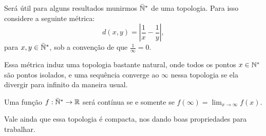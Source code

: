 Será útil para alguns resultados munirmos ${\mathbb{\bar{N}^*}}$ de uma
topologia. Para isso considere a seguinte métrica:
\begin{equation}
  \label{eq:metrica}
  d(x, y) = \left\lvert \frac{1}{x} - \frac{1}{y} \right\rvert,
\end{equation}
para $x, y \in {\mathbb{\bar{N}^*}}$, sob a convenção de que $\frac{1}{\infty} = 0$.

Essa métrica induz uma topologia bastante natural, onde todos os
pontos $x \in {\mathbb{N^*}}$ são pontos isolados, e uma sequência converge ao
$\infty$ nessa topologia se ela divergir para infinito da maneira
usual.

Uma função $f: {\mathbb{\bar{N}^*}} \to {\mathbb{R}}$ será contínua se e somente se
$f(\infty) = \lim_{x \to \infty} f(x)$.

Vale ainda que essa topologia é compacta, nos dando boas propriedades
para trabalhar.

